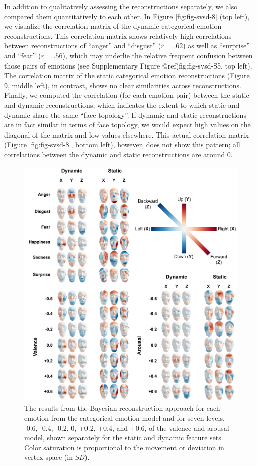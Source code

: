 \documentclass[11pt,american,a4paper,oneside,]{memoir} %
\begin{document}
In addition to qualitatively assessing the reconstructions separately, we also compared them quantitatively to each other. In Figure \ref{fig:fig-svsd-8} (top left), we visualize the correlation matrix of the dynamic categorical emotion reconstructions. This correlation matrix shows relatively high correlations between reconstructions of ``anger'' and ``disgust'' (\(r = .62\)) as well as ``surprise'' and ``fear'' (\(r = .56\)), which may underlie the relative frequent confusion between those pairs of emotions (see Supplementary Figure @ref(fig:fig-svsd-S5, top left). The correlation matrix of the static categorical emotion reconstructions (Figure 9, middle left), in contrast, shows no clear similarities across reconstructions. Finally, we computed the correlation (for each emotion pair) between the static and dynamic reconstructions, which indicates the extent to which static and dynamic share the same ``face topology''. If dynamic and static reconstructions are in fact similar in terms of face topology, we would expect high values on the diagonal of the matrix and low values elsewhere. This actual correlation matrix (Figure \ref{fig:fig-svsd-8}, bottom left), however, does not show this pattern; all correlations between the dynamic and static reconstructions are around 0.

\begin{figure}
\centering
\includegraphics{_bookdown_files/static-vs-dynamic-files/figures/figure_7.pdf}
\caption{\label{fig:fig-svsd-7}The results from the Bayesian reconstruction approach for each emotion from the categorical emotion model and for seven levels, -0.6, -0.4, -0.2, 0, +0.2, +0.4, and +0.6, of the valence and arousal model, shown separately for the static and dynamic feature sets. Color saturation is proportional to the movement or deviation in vertex space (in \emph{SD}).}
\end{figure}
\end{document}
